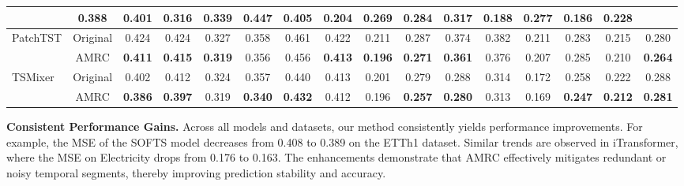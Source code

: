 \documentclass{article}
\newcommand{\orim}{Original}
\newcommand{\ourm}{AMRC}
\begin{document}
\begin{table*}[htbp]
{\begin{tabular}{cccccccccccccccc}
& 0.388 & \textbf{0.401}  
& 0.316 & \textbf{0.339}  
& \textbf{0.447} & \textbf{0.405}  
& 0.204 & \textbf{0.269}
& 0.284 & 0.317
& \textbf{0.188} & 0.277
& \textbf{0.186} & \textbf{0.228} \\
\midrule
\multicolumn{1}{l|}{\multirow{2}{*}{PatchTST}} & \orim
& 0.424 & 0.424 
& 0.327 & 0.358 
& 0.461 & 0.422 
& 0.211 & 0.287
& 0.374 & 0.382
& 0.211 & 0.283
& 0.215 & 0.280\\
\multicolumn{1}{l|}{} & \ourm
& \textbf{0.411} & \textbf{0.415}
& \textbf{0.319} & 0.356  
& 0.456 & \textbf{0.413}  
& \textbf{0.196} & \textbf{0.271}
& \textbf{0.361} & 0.376
& 0.207 & 0.285
& 0.210 & \textbf{0.264} \\
\midrule
\multicolumn{1}{l|}{\multirow{2}{*}{TSMixer}} & \orim
& 0.402 & 0.412
& 0.324 & 0.357
& 0.440 & 0.413
& 0.201 & 0.279
& 0.288 & 0.314
& 0.172 & 0.258
& 0.222 & 0.288 \\
\multicolumn{1}{l|}{} & \ourm
& \textbf{0.386} & \textbf{0.397}  
& 0.319 & \textbf{0.340}  
& \textbf{0.432} & 0.412 
& 0.196 & \textbf{0.257}
& \textbf{0.280} & 0.313
& 0.169 & \textbf{0.247}
& \textbf{0.212} & \textbf{0.281} \\
\bottomrule
\end{tabular}
}
\vspace{0.5em}

\end{table*}




\textbf{Consistent Performance Gains.} Across all models and datasets, our method consistently yields performance improvements. For example, the MSE of the SOFTS model decreases from 0.408 to 0.389 on the ETTh1 dataset. Similar trends are observed in iTransformer, where the MSE on Electricity drops from 0.176 to 0.163. The enhancements demonstrate that AMRC effectively mitigates redundant or noisy temporal segments, thereby improving prediction stability and accuracy.
\end{document}
